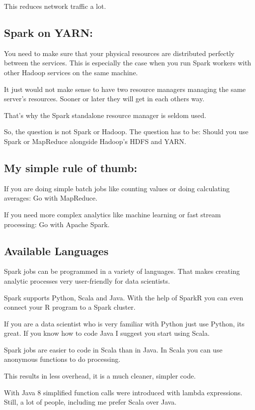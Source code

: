 \documentclass[12pt, numbers=noenddot]{scrreprt} %
\begin{document}
This reduces network traffic a lot.

\subsection{Spark on YARN:} You need to make sure that your physical resources are distributed perfectly between the services. This is especially the case when you run Spark workers with other Hadoop services on the same machine.

It just would not make sense to have two resource managers managing the same server’s resources. Sooner or later they will get in each others way.

That’s why the Spark standalone resource manager is seldom used.

So, the question is not Spark or Hadoop. The question has to be: Should you use Spark or MapReduce alongside Hadoop’s HDFS and YARN.

\subsection{My simple rule of thumb:}

If you are doing simple batch jobs like counting values or doing calculating averages: Go with MapReduce.

If you need more complex analytics like machine learning or fast stream processing: Go with Apache Spark.

\subsection{Available Languages}

Spark jobs can be programmed in a variety of languages. That makes creating analytic processes very user-friendly for data scientists.

Spark supports Python, Scala and Java. With the help of SparkR you can even connect your R program to a Spark cluster.

If you are a data scientist who is very familiar with Python just use Python, its great. If you know how to code Java I suggest you start using Scala.

Spark jobs are easier to code in Scala than in Java. In Scala you can use anonymous functions to do processing.

This results in less overhead, it is a much cleaner, simpler code.

With Java 8 simplified function calls were introduced with lambda expressions. Still, a lot of people, including me prefer Scala over Java.
\end{document}
